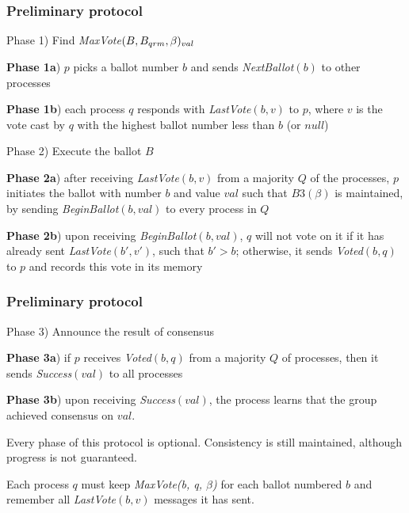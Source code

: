 \documentclass[10 pt]{beamer}
\begin{document}
\begin{frame}
\frametitle{Preliminary protocol}%

  Phase 1) Find \textit{MaxVote}$(B, B_{qrm}, \beta)_{val}$
   
  \hspace{3 mm} \textbf{Phase 1a}) $p$ picks a ballot number $b$ and sends \textit{NextBallot}$(b)$ to other processes
   
  \hspace{3 mm} \textbf{Phase 1b}) each process $q$ responds with \textit{LastVote}$(b, v)$ to $p$, where $v$ is the vote cast by $q$ with the highest ballot number less than $b$ (or $null$)
   
  \vspace{6 mm}
   
  Phase 2) Execute the ballot $B$
   
  \hspace{3 mm} \textbf{Phase 2a}) after receiving \textit{LastVote}$(b, v)$ from a majority $Q$ of the processes, $p$ initiates the ballot with number $b$ and value $val$ such that $B3(\beta)$ is maintained, by sending \textit{BeginBallot}$(b, val)$ to every process in $Q$%
      
  \hspace{3 mm} \textbf{Phase 2b}) upon receiving \textit{BeginBallot}$(b, val)$, $q$ will not vote on it if it has already sent \textit{LastVote}$(b', v')$, such that $b' > b$; otherwise, it sends \textit{Voted}$(b, q)$ to $p$ and records this vote in its memory
  
\end{frame}



\begin{frame}
\frametitle{Preliminary protocol}
   
  Phase 3) Announce the result of consensus
   
  \hspace{3 mm} \textbf{Phase 3a}) if $p$ receives \textit{Voted}$(b, q)$ from a majority $Q$ of processes, then it sends \textit{Success}$(val)$ to all processes
      
  \hspace{3 mm} \textbf{Phase 3b}) upon receiving \textit{Success}$(val)$, the process learns that the group achieved consensus on $val$.
  
  \vspace{6mm}
  Every phase of this protocol is optional. Consistency is still maintained, although progress is not guaranteed.

  \vspace{6mm}
  Each process $q$ must keep \textit{MaxVote(b, q, $\beta$)} for each ballot numbered $b$ and remember all \textit{LastVote}$(b, v)$ messages it has sent.
 
\end{frame}
\end{document}
